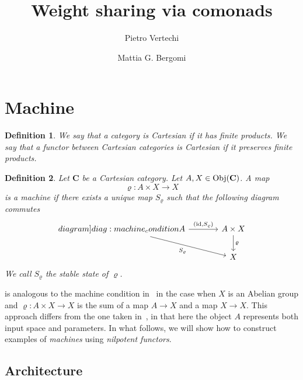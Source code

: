 \documentclass[12pt]{article}
\title{Weight sharing via comonads}
\author{
    Pietro Vertechi \and Mattia G. Bergomi
}
\date{}
\newtheorem{definition}{Definition}
\newcommand{\Obj}{{\textnormal{Obj}}}
\newcommand{\id}{{\textnormal{id}}}
\newcommand{\Cat}{{\mathbf{C}}}
\begin{document}
\maketitle
\begin{abstract}
\end{abstract}

\section{Machine}

\begin{definition}\label{def:cartesian_category}
    We say that a category is {\em Cartesian} if it has finite products. We say that a functor between Cartesian categories is Cartesian if it preserves finite products.
\end{definition}

\begin{definition}\label{def:machine}
    Let $\Cat$ be a Cartesian category. Let $A, X \in \Obj(\Cat)$. A map
    \begin{equation*}
        \varrho \colon A \times X \rightarrow X
    \end{equation*}
    is a {\em machine} if there exists a unique map $S_\varrho$ such that the following diagram commutes
    \begin{equation}
        \begin{tikzcd}[column sep=large]\label[diagram]{diag:machine_condition}
            A \arrow[rightarrow]{r}{\left(\id, S_\varrho\right)}
            \arrow[rightarrow,swap]{dr}{S_\varrho}
            & A \times X \arrow[rightarrow]{d}{\varrho} \\
            & X
        \end{tikzcd}
    \end{equation}
    We call $S_\varrho$ the {\em stable state} of $\varrho$.
\end{definition}

 is analogous to the machine condition in~\cite{2020arXiv200702777V} in the case when $X$ is an Abelian group and $\varrho\colon A \times X \rightarrow X$ is the sum of a map $A \rightarrow X$ and a map $X \rightarrow X$.
This approach differs from the one taken in~\cite{2020arXiv200702777V}, in that here the object $A$ represents both input space and parameters. In what follows, we will show how to construct examples of {\em machines} using {\em nilpotent functors}.

\subsection{Architecture}
\end{document}
